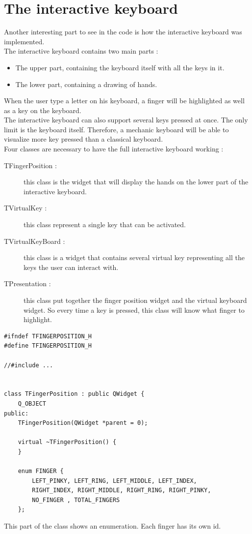 \section{The interactive keyboard}
Another interesting part to see in the code is how the interactive keyboard was implemented.\\
The interactive keyboard contains two main parts :
\begin{itemize}
	\item The upper part, containing the keyboard itself with all the keys in it.
	\item The lower part, containing a drawing of hands.
\end{itemize}
When the user type a letter on his keyboard, a finger will be highlighted as well as a key on the keyboard.\\
The interactive keyboard can also support several keys pressed at once. The only limit is the keyboard itself. Therefore, a mechanic keyboard will be able to visualize more key pressed than a classical keyboard.\\
Four classes are necessary to have the full interactive keyboard working :
\begin{description}
	\item[TFingerPosition : ] this class is the widget that will display the hands on the lower part of the interactive keyboard.
	\item[TVirtualKey : ] this class represent a single key that can be activated.
	\item[TVirtualKeyBoard :] this class is a widget that contains several virtual key representing all the keys the user can interact with.
	\item[TPresentation : ] this class put together the finger position widget and the virtual keyboard widget. So every time a key is pressed, this class will know what finger to highlight.
\end{description}

\begin{lstlisting}
#ifndef TFINGERPOSITION_H
#define TFINGERPOSITION_H

//#include ...


class TFingerPosition : public QWidget {
    Q_OBJECT
public:
    TFingerPosition(QWidget *parent = 0);

    virtual ~TFingerPosition() {
    }

    enum FINGER {
        LEFT_PINKY, LEFT_RING, LEFT_MIDDLE, LEFT_INDEX, 
        RIGHT_INDEX, RIGHT_MIDDLE, RIGHT_RING, RIGHT_PINKY,
        NO_FINGER , TOTAL_FINGERS
    };
\end{lstlisting}
This part of the class shows an enumeration. Each finger has its own id.


